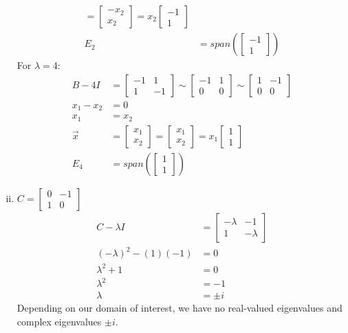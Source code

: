\documentclass{math}
\begin{document}
\begin{enumerate}[(i)]
\begin{align*}
      = \begin{bmatrix}-x_2 \\ x_2\end{bmatrix}
      = x_2\begin{bmatrix}-1 \\ 1\end{bmatrix} \\
    E_2 &= span\left(\begin{bmatrix}-1 \\ 1\end{bmatrix}\right)
  \end{align*}
  For \( \lambda = 4 \):
  \begin{align*}
    B-4I &= \begin{bmatrix}-1 & 1 \\ 1 & -1\end{bmatrix}
      \sim \begin{bmatrix}-1 & 1 \\ 0 & 0\end{bmatrix}
      \sim \begin{bmatrix}1 & -1 \\ 0 & 0\end{bmatrix} \\
    x_1-x_2 &= 0 \\
    x_1 &= x_2 \\
    \vec{x} &= \begin{bmatrix}x_1 \\ x_2\end{bmatrix}
      = \begin{bmatrix}x_1 \\ x_2\end{bmatrix}
      = x_1\begin{bmatrix}1 \\ 1\end{bmatrix} \\
    E_4 &= span\left(\begin{bmatrix}1 \\ 1\end{bmatrix}\right)
  \end{align*}
  \item \( C = \begin{bmatrix}0 & -1 \\ 1 & 0\end{bmatrix} \)
  \begin{align*}
    C-\lambda I &= \begin{bmatrix}
      -\lambda & -1 \\
      1 & -\lambda
    \end{bmatrix} \\
    (-\lambda)^2-(1)(-1) &= 0 \\
    \lambda^2+1 &= 0 \\
    \lambda^2 &= -1 \\
    \lambda &= \pm i
  \end{align*}
  Depending on our domain of interest, we have no real-valued eigenvalues and
  complex eigenvalues \( \pm i \).
\end{enumerate}
\end{document}
